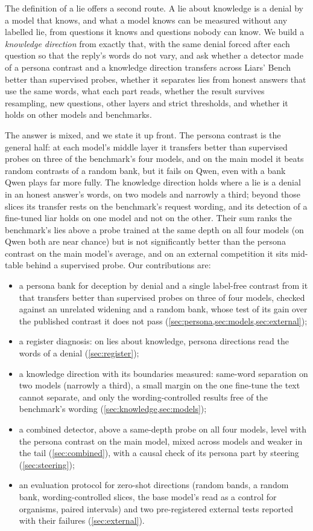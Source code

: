 The definition of a lie offers a second route. A lie about knowledge is a denial by a model that knows,
and what a model knows can be measured without any labelled lie, from questions it knows and questions
nobody can know. We build a \emph{knowledge direction} from exactly that, with the same denial forced
after each question so that the reply's words do not vary, and ask whether a detector made of a persona
contrast and a knowledge direction transfers across Liars' Bench better than supervised probes, whether
it separates lies from honest answers that use the same words, what each part reads, whether the result
survives resampling, new questions, other layers and strict thresholds, and whether it holds on other
models and benchmarks.

The answer is mixed, and we state it up front. The persona contrast is the general half: at each model's
middle layer it transfers better than supervised probes on three of the benchmark's four models, and on
the main model it beats random contrasts of a random bank, but it fails on Qwen, even with a bank Qwen
plays far more fully. The knowledge direction holds where a lie is a denial in an honest answer's words,
on two models and narrowly a third; beyond those slices its transfer rests on the benchmark's request
wording, and its detection of a fine-tuned liar holds on one model and not on the other. Their sum ranks
the benchmark's lies above a probe trained at the same depth on all four models (on Qwen both are near
chance) but is not significantly better than the persona contrast on the main model's average, and on an
external competition it sits mid-table behind a supervised probe. Our contributions are:
\begin{itemize}[leftmargin=1.2em, itemsep=0pt, topsep=1pt]
\item a persona bank for deception by denial and a single label-free contrast from it that transfers
  better than supervised probes on three of four models, checked against an unrelated widening and a
  random bank, whose test of its gain over the published contrast it does not pass
  (\cref{sec:persona,sec:models,sec:external});
\item a register diagnosis: on lies about knowledge, persona directions read the words of a denial
  (\cref{sec:register});
\item a knowledge direction with its boundaries measured: same-word separation on two models (narrowly a
  third), a small margin on the one fine-tune the text cannot separate, and only the wording-controlled
  results free of the benchmark's wording (\cref{sec:knowledge,sec:models});
\item a combined detector, above a same-depth probe on all four models, level with the persona contrast
  on the main model, mixed across models and weaker in the tail (\cref{sec:combined}), with a causal
  check of its persona part by steering (\cref{sec:steering});
\item an evaluation protocol for zero-shot directions (random bands, a random bank, wording-controlled
  slices, the base model's read as a control for organisms, paired intervals) and two pre-registered
  external tests reported with their failures (\cref{sec:external}).
\end{itemize}
